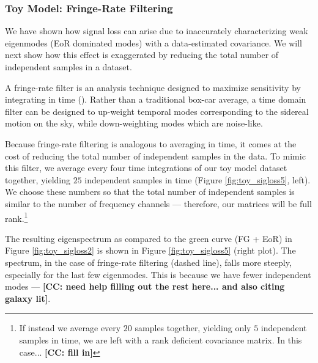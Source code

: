 \documentclass[preprint2,numberedappendix,tighten]{aastex6}  %
\newcommand{\cc}[1]{{\color{purple} \textbf{[CC: #1]}}}
\begin{document}
\subsubsection{Toy Model: Fringe-Rate Filtering}

We have shown how signal loss can arise due to inaccurately characterizing weak eigenmodes (EoR dominated modes) with a data-estimated covariance. We will next show how this effect is exaggerated by reducing the total number of independent samples in a dataset. 

A fringe-rate filter is an analysis technique designed to maximize sensitivity by integrating in time (\citealt{parsons_et_al2016}). Rather than a traditional box-car average, a time domain filter can be designed to up-weight temporal modes corresponding to the sidereal motion on the sky, while down-weighting modes which are noise-like. 

Because fringe-rate filtering is analogous to averaging in time, it comes at the cost of reducing the total number of independent samples in the data. To mimic this filter, we average every four time integrations of our toy model dataset together, yielding $25$ independent samples in time (Figure \ref{fig:toy_sigloss5}, left). We choose these numbers so that the total number of independent samples is similar to the number of frequency channels --- therefore, our matrices will be full rank.\footnote{If instead we average every $20$ samples together, yielding only $5$ independent samples in time, we are left with a rank deficient covariance matrix. In this case... \cc{fill in}}

The resulting eigenspectrum as compared to the green curve (FG + EoR) in Figure \ref{fig:toy_sigloss2} is shown in Figure \ref{fig:toy_sigloss5} (right plot). The spectrum, in the case of fringe-rate filtering (dashed line), falls more steeply, especially for the last few eigenmodes. This is because we have fewer independent modes --- \cc{need help filling out the rest here... and also citing galaxy lit}. 
\end{document}
